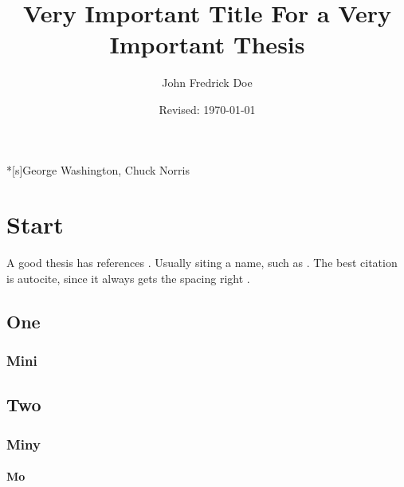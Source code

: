 \documentclass{utthesis}
\begin{document}
\author{John Fredrick Doe} 
\title{Very Important Title For a Very Important Thesis} 
\date{Revised: \today}

\frontmatter

\UTcopyrightlegend %

\begin{UTcommittee}
\end{UTcommittee}


\setcounter{page}{4}



%
%

\begin{UTabstract}*[s]{George Washington, Chuck Norris}
\lipsum[1]
\end{UTabstract}


\tableofcontents

\listoffigures

\mainmatter

\chapter{Start}
A good thesis has references \cite{bib:somebook}. Usually siting a name, such as \textcite{bib:someart}. The best citation is autocite, since it always gets the spacing right \autocite{bib:somethesis}.

\lipsum[3]
\section{One}
\subsection{Mini}
\section{Two}
\subsection{Miny}
\subsubsection{Mo}
\end{document}
